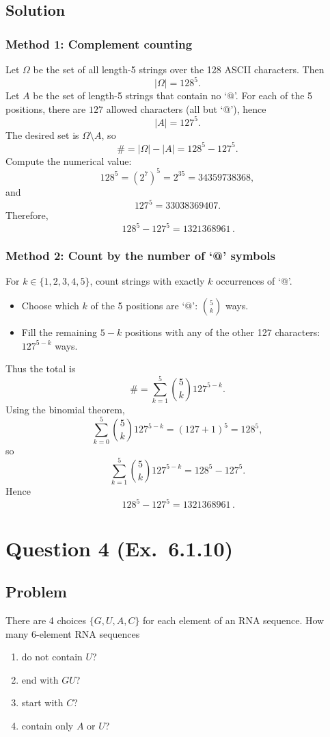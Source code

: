 \documentclass[12pt]{article}
\begin{document}
\subsection{Solution}

\subsubsection{Method 1: Complement counting}
Let $\Omega$ be the set of all length-5 strings over the 128 ASCII characters. Then
\[
|\Omega| = 128^5.
\]
Let $A$ be the set of length-5 strings that contain no `@'. For each of the 5 positions, there are $127$ allowed characters (all but `@'), hence
\[
|A| = 127^5.
\]
The desired set is $\Omega\setminus A$, so
\[
\# = |\Omega|-|A| = 128^5 - 127^5.
\]
Compute the numerical value:
\[
128^5 = (2^7)^5 = 2^{35} = 34359738368,
\]
and
\[
127^5 = 33038369407.
\]
Therefore,
\[
\boxed{\,128^5-127^5 = 1321368961\,}.
\]

\subsubsection{Method 2: Count by the number of `@' symbols}
For $k\in\{1,2,3,4,5\}$, count strings with exactly $k$ occurrences of `@'.
\begin{itemize}[leftmargin=*]
\item Choose which $k$ of the 5 positions are `@': $\binom{5}{k}$ ways.
\item Fill the remaining $5-k$ positions with any of the other 127 characters: $127^{5-k}$ ways.
\end{itemize}
Thus the total is
\[
\# = \sum_{k=1}^{5} \binom{5}{k} 127^{5-k}.
\]
Using the binomial theorem,
\[
\sum_{k=0}^{5} \binom{5}{k} 127^{5-k} = (127+1)^5 = 128^5,
\]
so
\[
\sum_{k=1}^{5} \binom{5}{k} 127^{5-k} = 128^5 - 127^5.
\]
Hence
\[
\boxed{\,128^5-127^5 = 1321368961\,}.
\]


\newpage
\section{Question 4 (Ex.\ 6.1.10)}
\subsection{Problem}
There are 4 choices $\{G,U,A,C\}$ for each element of an RNA sequence. How many 6-element RNA sequences
\begin{enumerate}[label=(\alph*)]
\item do not contain $U$?
\item end with $GU$?
\item start with $C$?
\item contain only $A$ or $U$?
\end{enumerate}
\end{document}
